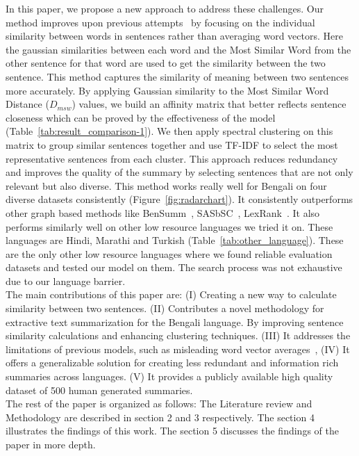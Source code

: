 In this paper, we propose a new approach to address these challenges.
Our method improves upon previous attempts~\cite{roychowdhury-etal-2022-spectral-base}
by focusing on the individual similarity between words in sentences rather than averaging word vectors.
Here the gaussian similarities between each word and the Most Similar Word from the other sentence for that word are
used to get the similarity between the two sentence.
This method captures the similarity of meaning between two sentences more accurately.
By applying Gaussian similarity to the Most Similar Word Distance ($D_{msw}$) values, we build an affinity matrix that
better reflects sentence closeness which can be proved by the effectiveness of the model (Table~\ref{tab:result_comparison-1}).
We then apply spectral clustering on this matrix to group similar sentences together and use TF-IDF to select the
most representative sentences from each cluster.
This approach reduces redundancy and improves the quality of the summary by selecting sentences that are not only
relevant but also diverse.
This method works really well for Bengali on four diverse datasets consistently (Figure~\ref{fig:radarchart}).
It consistently outperforms other graph based methods like BenSumm~\cite{chowdhury-etal-2021-tfidf-clustering},
SASbSC~\cite{roychowdhury-etal-2022-spectral-base}, LexRank~\cite{Erkan-lexRank-2004}.
It also performs similarly well on other low resource languages we tried it on.
These languages are Hindi, Marathi and Turkish (Table~\ref{tab:other_language}).
These are the only other low resource languages where we found reliable evaluation datasets and tested our model on them.
The search process was not exhaustive due to our language barrier.\\

The main contributions of this paper are:
(I) Creating a new way to calculate similarity between two sentences.
(II) Contributes a novel methodology for extractive text summarization for the Bengali language.
By improving sentence similarity calculations and enhancing clustering techniques.
(III) It addresses the limitations of previous models, such as misleading word vector averages~\cite{roychowdhury-etal-2022-spectral-base},
(IV) It offers a generalizable solution for creating less redundant and information rich summaries across languages.
(V) It provides a publicly available high quality dataset of 500 human generated summaries.\\

The rest of the paper is organized as follows:
The Literature review and Methodology are described in section 2 and 3 respectively.
The section 4 illustrates the findings of this work.
The section 5 discusses the findings of the paper in more depth.